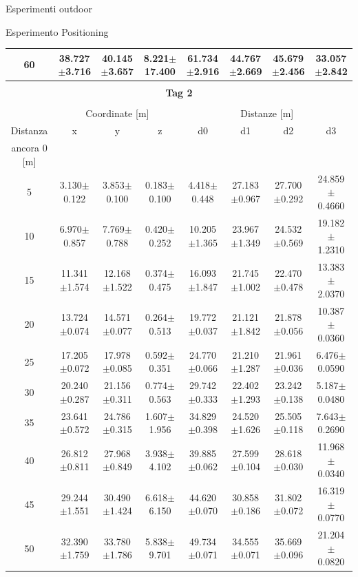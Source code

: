\documentclass[12pt]{report}
\begin{document}
\begin{section}{Esperimenti outdoor}
\begin{subsection}{Esperimento Positioning}
\begin{table}[H]
{\begin{tabular}{|c||c|c|c||c|c|c|c||}
					\hline
					60&38.727$\pm$3.716&40.145$\pm$3.657&8.221$\pm$17.400&			61.734$\pm$2.916&44.767$\pm$2.669&45.679$\pm$2.456&33.057$\pm$2.842\\
					\hline
					\hline
					\multicolumn{8}{|c|}{}\\
					\multicolumn{8}{|c|}{\textbf{\Large Tag 2}}\\
					\multicolumn{8}{|c|}{}\\
					\hline
					&\multicolumn{3}{|c||}{Coordinate [m]}&											\multicolumn{4}{|c||}{Distanze [m]}\\
					\hline
					Distanza&x& 				y& 				z& 														d0& 				d1&				d2&			d3\\
					ancora 0 [m]&&&&&&&\\
					\hline
					5&3.130$\pm$0.122&3.853$\pm$0.100&0.183$\pm$0.100&    			4.418$\pm$0.448&27.183$\pm$0.967&27.700$\pm$0.292&24.859$\pm$0.4660\\
					\hline
				    10&6.970$\pm$0.857&7.769$\pm$0.788&0.420$\pm$0.252&   			10.205$\pm$1.365&23.967$\pm$1.349&24.532$\pm$0.569&19.182$\pm$1.2310\\
					\hline
				   15&11.341$\pm$1.574&12.168$\pm$1.522&0.374$\pm$0.475&  			16.093$\pm$1.847&21.745$\pm$1.002&22.470$\pm$0.478&13.383$\pm$2.0370\\
					\hline
				   20&13.724$\pm$0.074&14.571$\pm$0.077&0.264$\pm$0.513&   		19.772$\pm$0.037&21.121$\pm$1.842&21.878$\pm$0.056&10.387$\pm$0.0360\\
					\hline
				   25&17.205$\pm$0.072&17.978$\pm$0.085&0.592$\pm$0.351&   		24.770$\pm$0.066&21.210$\pm$1.287&21.961$\pm$0.036&6.476$\pm$0.0590\\
					\hline
				   30&20.240$\pm$0.287&21.156$\pm$0.311&0.774$\pm$0.563&   		29.742$\pm$0.333&22.402$\pm$1.293&23.242$\pm$0.138&5.187$\pm$0.0480\\
					\hline
				   35&23.641$\pm$0.572&24.786$\pm$0.315&1.607$\pm$1.956&   		34.829$\pm$0.398&24.520$\pm$1.626&25.505$\pm$0.118&7.643$\pm$0.2690\\
					\hline
				   40&26.812$\pm$0.811&27.968$\pm$0.849&3.938$\pm$4.102&   		39.885$\pm$0.062&27.599$\pm$0.104&28.618$\pm$0.030&11.968$\pm$0.0340\\
					\hline
				   45&29.244$\pm$1.551&30.490$\pm$1.424&6.618$\pm$6.150&   		44.620$\pm$0.070&30.858$\pm$0.186&31.802$\pm$0.072&16.319$\pm$0.0770\\
					\hline
				   50&32.390$\pm$1.759&33.780$\pm$1.786&5.838$\pm$9.701&   		49.734$\pm$0.071&34.555$\pm$0.071&35.669$\pm$0.096&21.204$\pm$0.0820\\

\end{tabular}}
\end{table}
\end{subsection}
\end{section}
\end{document}
